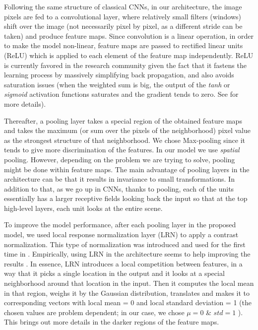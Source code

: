 
Following the same structure of classical CNNs, in our architecture, the image pixels are fed to a convolutional layer, where relatively small filters (windows) shift over the image (not necessarily pixel by pixel, as a different stride can be taken) and produce feature maps. Since convolution is a linear operation, in order to make the model non-linear, feature maps are passed to rectified linear units (ReLU) \cite{nair2010rectified} which is applied to each element of the feature map independently. ReLU is currently favored in the research community given the fact that it fastens the learning process by massively simplifying back propagation, and also avoids saturation issues (when the weighted sum is big, the output of the \textit{tanh} or \textit{sigmoid} activation functions saturates and the gradient tends to zero. See \cite{hansen1990neural, amit1987statistical} for more details). 

\indent Thereafter, a pooling layer takes a special region of the obtained feature maps and takes the maximum (or sum over the pixels of the neighborhood) pixel value as the strongest structure of that neighborhood.  We chose Max-pooling since it tends to give more discrimination of the features\cite{boureau2010theoretical}. In our model we use \textit{spatial} pooling. However, depending on the problem we are trying to solve, pooling might be done within feature maps\cite{goodfellow2013maxout}. The main advantage of pooling layers in the architecture can be that it results in invariance to small transformations. In addition to that, as we go up in CNNs, thanks to pooling, each of the units essentially has a larger receptive fields looking back the input so that at the top high-level layers, each unit looks at the entire scene.  

To improve the model performance, after each pooling layer in the proposed model, we used local response normalization layer (LRN) to apply a contrast normalization. This type of normalization was introduced and used for the first time in \cite{krizhevsky2012imagenet}. Empirically, using LRN in the architecture seems to help improving the results \cite{jarrett2009best, krizhevsky2012imagenet}. In essence, LRN introduces a local competition between features, in a way that it picks a single location in the output and it looks at a special neighborhood around that location in the input.  Then it computes the local mean in that region, weighs it by the Gaussian distribution, translates and makes it to corresponding vectors with local mean = 0 and local standard deviation = 1 (the chosen values are problem dependent; in our case, we chose $\mu = 0$ \& $std = 1 $ ). This brings out more details in the darker regions of the feature maps. 

